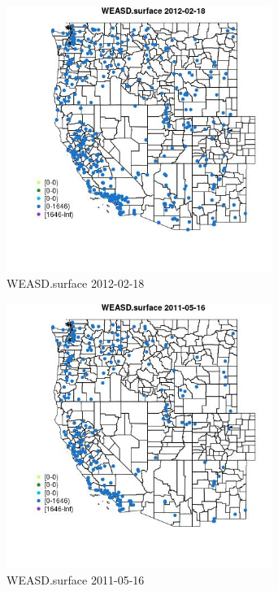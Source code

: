 \begin{figure} 
\centering  
\includegraphics[width=0.77\textwidth]{Code_Outputs/Report_ML_input_PM25_Step4_part_f_de_duplicated_aveswNAs_MapObsWEASDsurface2012-02-18.jpg} 
\caption{\label{fig:Report_ML_input_PM25_Step4_part_f_de_duplicated_aveswNAsMapObsWEASDsurface2012-02-18}WEASD.surface 2012-02-18} 
\end{figure} 
 

\begin{figure} 
\centering  
\includegraphics[width=0.77\textwidth]{Code_Outputs/Report_ML_input_PM25_Step4_part_f_de_duplicated_aveswNAs_MapObsWEASDsurface2011-05-16.jpg} 
\caption{\label{fig:Report_ML_input_PM25_Step4_part_f_de_duplicated_aveswNAsMapObsWEASDsurface2011-05-16}WEASD.surface 2011-05-16} 
\end{figure} 
 


